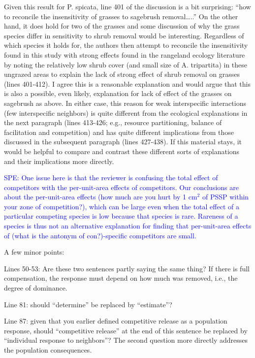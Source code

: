 \documentclass[12pt]{article}
\newcommand{\response}{\textcolor{blue}}
\begin{document}
{Given this result for P. spicata, line 401 of the discussion is a bit surprising: “how to reconcile the
insensitivity of grasses to sagebrush removal…..” On the other hand, it does hold for two of the grasses
and some discussion of why the grass species differ in sensitivity to shrub removal would be interesting.
Regardless of which species it holds for, the authors then attempt to reconcile the insensitivity found in
this study with strong effects found in the rangeland ecology literature by noting the relatively low shrub
cover (and small size of A. tripartita) in these ungrazed areas to explain the lack of strong effect of shrub
removal on grasses (lines 401-412). I agree this is a reasonable explanation and would argue that this is
also a possible, even likely, explanation for lack of effect of the grasses on sagebrush as above. In either
case, this reason for weak interspecific interactions (few interspecific neighbors) is quite different from
the ecological explanations in the next paragraph (lines 413-426; e.g., resource partitioning, balance of
facilitation and competition) and has quite different implications from those discussed in the
subsequent paragraph (lines 427-438). If this material stays, it would be helpful to compare and
contrast these different sorts of explanations and their implications more directly.

\response{SPE: One issue here is that the reviewer is confusing the total effect of competitors with the per-unit-area effects of competitors. 
Our conclusions are about the per-unit-area effects (how much are you hurt by 1 cm$^2$ of PSSP within your zone of
competition?), which can be large even when the total effect of a particular competing species is low because that species
is rare. Rareness of a species is thus not an alternative explanation for finding that per-unit-area effects of (what is the
antonym of con?)-specific competitors are small.} 

A few minor points:

Lines 50-53: Are these two sentences partly saying the same thing? If there is full compensation, the
response must depend on how much was removed, i.e., the degree of dominance.

Line 81: should “determine” be replaced by “estimate”?

Line 87: given that you earlier defined competitive release as a population response, should
“competitive release” at the end of this sentence be replaced by “individual response to neighbors”?
The second question more directly addresses the population consequences.

}
\end{document}
